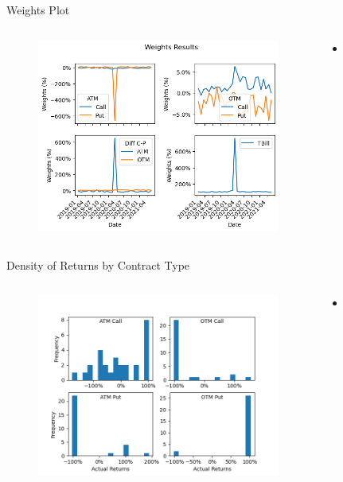 \documentclass[9pt]{beamer}
\begin{document}
\begin{frame}{Weights Plot \citeauthor{faias2017optimal}}
\begin{columns}
\begin{figure}
    \includegraphics[width=8cm]{WeightsPlot.png}
\end{figure}
\begin{center}
\begin{itemize}
    \item  
\end{itemize}
\end{center}
\end{columns}
\end{frame}

\begin{frame}{Density of Returns by Contract Type}
\begin{columns}
\begin{figure}
    \includegraphics[width=8cm]{Fig3_kde.png}
\end{figure}
\begin{center}
\begin{itemize}
    \item  
\end{itemize}
\end{center}
\end{columns}
\end{frame}
\end{document}
